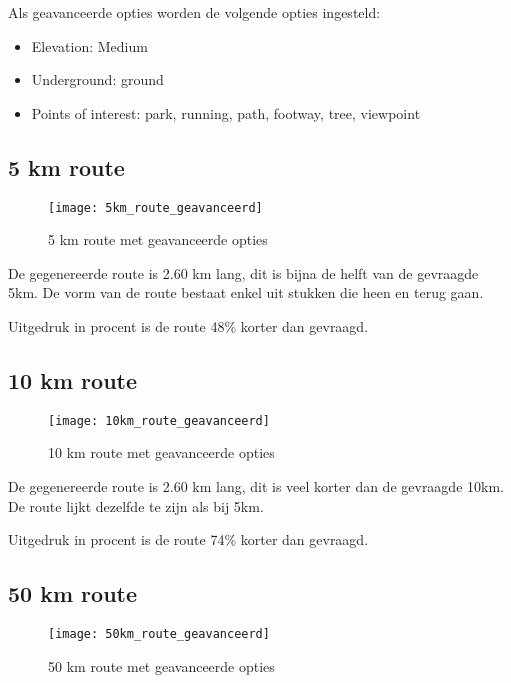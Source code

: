 Als geavanceerde opties worden de volgende opties ingesteld:
\begin{itemize}
    \item Elevation: Medium
    \item Underground: ground
    \item Points of interest: park, running, path, footway, tree, viewpoint
\end{itemize}

\subsection{5 km route}

\begin{figure}[H]
    \centering
    \texttt{[image: 5km\_route\_geavanceerd]}
    \caption{5 km route met geavanceerde opties}
    \label{fig:5km_route_geavanceerd}

\end{figure}

De gegenereerde route is 2.60 km lang, dit is bijna de helft van de gevraagde 5km. De vorm van de route bestaat enkel uit stukken die heen en terug gaan.

Uitgedruk in procent is de route 48\% korter dan gevraagd.

\subsection{10 km route}

\begin{figure}[H]
    \centering
    \texttt{[image: 10km\_route\_geavanceerd]}
    \caption{10 km route met geavanceerde opties}
    \label{fig:10km_route_geavanceerd}

\end{figure}

De gegenereerde route is 2.60 km lang, dit is veel korter dan de gevraagde 10km. De route lijkt dezelfde te zijn als bij 5km.

Uitgedruk in procent is de route 74\% korter dan gevraagd.

\subsection{50 km route}

\begin{figure}[H]
    \centering
    \texttt{[image: 50km\_route\_geavanceerd]}
    \caption{50 km route met geavanceerde opties}
    \label{fig:50km_route_geavanceerd}

\end{figure}

